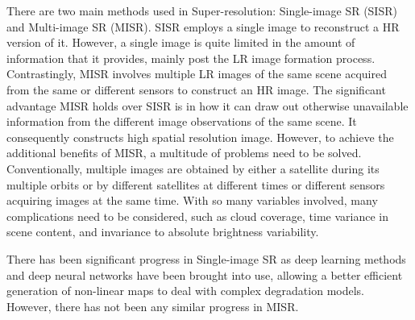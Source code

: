 \documentclass[journal]{IEEEtran}
\begin{document}
There are two main methods used in Super-resolution: Single-image SR (SISR) and Multi-image SR (MISR). SISR employs a single image to reconstruct a HR version of it. However, a single image is quite limited in the amount of information that it provides, mainly post the LR image formation process. Contrastingly, MISR involves multiple LR images of the same scene acquired from the same or different sensors to construct an HR image. The significant advantage MISR holds over SISR is in how it can draw out otherwise unavailable information from the different image observations of the same scene. It consequently constructs high spatial resolution image. 
However, to achieve the additional benefits of MISR, a multitude of problems need to be solved. Conventionally, multiple images are obtained by either a satellite during its multiple orbits or by different satellites at different times or different sensors acquiring images at the same time. With so many variables involved, many complications need to be considered, such as cloud coverage, time variance in scene content, and invariance to absolute brightness variability.

There has been significant progress in Single-image SR as deep learning methods and deep neural networks have been brought into use, allowing a better efficient generation of non-linear maps to deal with complex degradation models. However, there has not been any similar progress in MISR.\\
\end{document}
